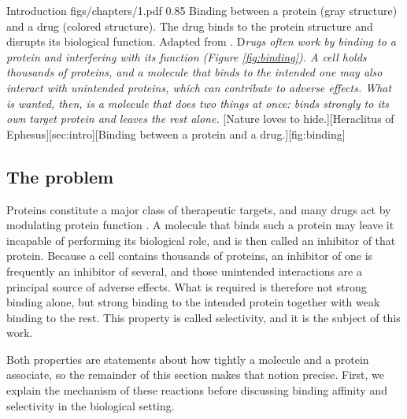 \documentclass[a4paper,12pt]{article}
\begin{document}
\newpage

\listoffigures
\thispagestyle{empty}

\newpage

\listoftables
\thispagestyle{empty}

\newpage
\renewcommand{\contentsname}{Contents}
\tableofcontents
\thispagestyle{empty}

\newpage
\hypersetup{pageanchor=true}

\chapteropening
{Introduction}
{figs/chapters/1.pdf}
{0.85\textwidth}
{Binding between a protein (gray structure) and a drug (colored structure). The drug binds to the protein structure and disrupts its biological function. Adapted from \textcite{10.1021/acs.jcim.9b00905}.}
{
    \lettrine[
        lines=2,
        lhang=0.0,
        loversize=0.0
    ]{D}{}\textit{rugs often work by binding to a protein and interfering with
        its function (Figure \ref{fig:binding}). A cell holds thousands of proteins, and a molecule that
        binds to the intended one may also interact with unintended proteins, which can contribute to adverse effects. What is wanted, then, is a molecule that does two
        things at once: binds strongly to its own target protein and leaves the rest alone.}
}[Nature loves to hide.][Heraclitus of Ephesus][sec:intro][Binding between a protein and a drug.][fig:binding]

\subsection{The problem}
Proteins constitute a major class of therapeutic targets, and many drugs act by
modulating protein function \parencite{Santos2017}. A molecule that binds such a
protein may leave it incapable of performing its biological role, and is then called
an inhibitor of that protein. Because a cell contains thousands of
proteins, an inhibitor of one is frequently an inhibitor of several, and those
unintended interactions are a principal source of adverse effects. What is required
is therefore not strong binding alone, but strong binding to the intended protein
together with weak binding to the rest. This property is called selectivity,
and it is the subject of this work.

Both properties are statements about how tightly a molecule and a protein associate,
so the remainder of this section makes that notion precise. First, we explain the mechanism
of these reactions before discussing binding affinity and selectivity in the biological setting.
\end{document}
